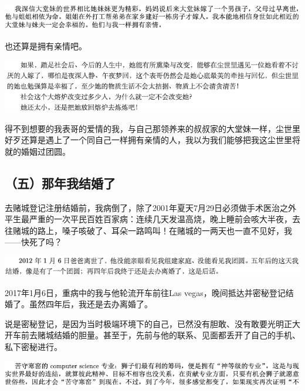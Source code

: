 \documentclass[9pt, b5paper]{article}
\begin{document}
\begin{center}
\includegraphics[width=.9\linewidth]{./pic/backups_plans_20210423_211802.png}
\end{center}

也还算是拥有亲情吧。

\begin{center}
\includegraphics[width=.9\linewidth]{./pic/backups_plans_20210423_213157.png}
\end{center}

得不到想要的我表哥的爱情的我，与自己那领养来的叔叔家的大堂妹一样，尘世里好歹还算是遇上了一个同自己一样拥有亲情的人，我以为我们能够把我这尘世里将就的婚姻过团圆。

\subsection{（五）那年我结婚了}
\label{sec:org43fb00c}

去赌城登记注册结婚前，我病倒了，除了2001年夏天7月29日必须做手术医治之外平生最严重的一次平民百姓百家病：连续几天发温高烧，晚上睡前会咳大半夜，去往赌城的路上，嗓子咳破了、耳朵一路鸣叫！在赌城的一两天也一直不见好，我——快死了吗？

\begin{center}
\includegraphics[width=.9\linewidth]{./pic/backups_plans_20210423_213744.png}
\end{center}

2017年1月6日，重病中的我与他轮流开车前往Las vegas，晚间抵达并密秘登记结婚了。虽然四年后，我还是去办离婚了。

说是密秘登记，是因为当时极端环境下的自己，已然没有胆敢、没有敢要光明正大开车前去赌城结婚的胆量。甚至于，先前与他的联系、见面都丢开了自己的手机、私下密秘进行。

\begin{center}
\includegraphics[width=.9\linewidth]{./pic/backups_plans_20210427_120126.png}
\end{center}
\end{document}
